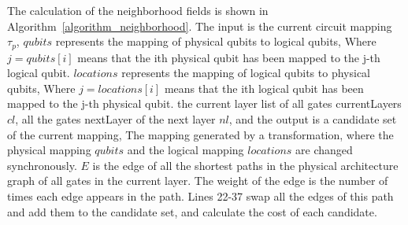 \documentclass[runningheads]{llncs}
\begin{document}
The calculation of the neighborhood fields is shown in Algorithm~\ref{algorithm_neighborhood}. The input is the current circuit mapping $\tau_{p}$, $ qubits $ represents the mapping of physical qubits to logical qubits, Where $ j = qubits [i] $ means that the ith physical qubit has been mapped to the j-th logical qubit. $ locations $ represents the mapping of logical qubits to physical qubits, Where $ j = locations [i] $ means that the ith logical qubit has been mapped to the j-th physical qubit.
the current layer list of all gates currentLayers $cl$, all the gates nextLayer of the next layer $nl$, and the output is a candidate set of the current mapping, The mapping generated by a transformation, where the physical mapping $ qubits $   and the logical mapping $ locations $ are changed synchronously. $E$ is the edge of all the shortest paths in the physical architecture graph of all gates in the current layer. The weight of the edge is the number of times each edge appears in the path. Lines 22-37 swap all the edges of this path and add them to the candidate set, and calculate the cost of each candidate.
\end{document}
